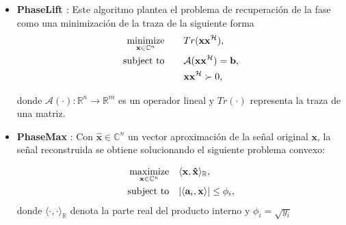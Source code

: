 \begin{itemize}
    \item \textbf{PhaseLift \cite{candes2013phaselift}}:
    Este algoritmo plantea el problema de recuperación de la fase como una minimización de la traza de la siguiente forma
    \begin{equation}
        \begin{aligned}
            \operatorname*{minimize}_{\mathbf{x} \in \mathbb{C}^{n}} \quad & \quad Tr(\mathbf{x}\mathbf{x}^{\mathcal{H}}), \\
            \operatorname*{subject \ to} \quad & \quad \mathcal{A}(\mathbf{x}\mathbf{x}^{\mathcal{H}}) = \mathbf{b}, \\
             &\quad  \mathbf{x}\mathbf{x}^{\mathcal{H}} \succ 0,
        \end{aligned}
    \end{equation}
    
    donde $\mathcal{A}( \cdot ): \mathbb{R}^{n} \rightarrow \mathbb{R}^{m}$ es un operador lineal y $Tr(\cdot)$ representa la traza de una matriz.
    
    \item \textbf{PhaseMax} \cite{goldstein2018phasemax}:
    Con $\mathbf{\hat{x}} \in \mathbb{C}^{n}$ un vector aproximación de la señal original $\mathbf{x}$, la señal reconstruida se obtiene solucionando el siguiente problema convexo:
        
    \begin{equation}
        \begin{aligned}
            \operatorname*{maximize}_{\mathbf{x}\in \mathbb{C}^n} \quad & \langle \mathbf{x}, \mathbf{\hat{x}} \rangle_{\mathbb{R}}, \\
            \operatorname*{subject \ to} \quad & \vert \langle \mathbf{a}_i,\mathbf{x} \rangle \vert \leq \phi_i,
        \end{aligned}
    \end{equation}
    donde $\langle \cdot, \cdot \rangle_{\mathbb{R}}$ denota la parte real del producto interno y $\phi_i = \sqrt{y_i}$
    
\end{itemize}

